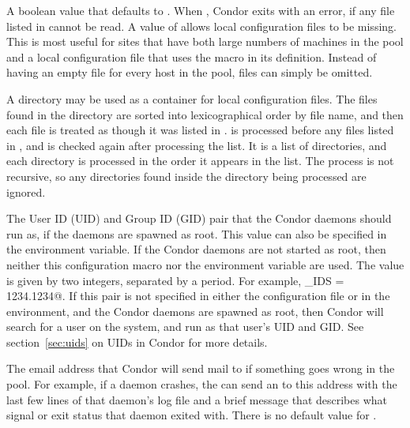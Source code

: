 \begin{description}
\label{param:RequireLocalConfigFile}
\item[\Macro{REQUIRE\_LOCAL\_CONFIG\_FILE}]
  A boolean value that defaults to .
  When , Condor exits with an error,
  if any file listed in  cannot be read.
  A value of  allows local configuration files to be missing.
  This is most useful for sites that have 
  both large numbers of machines in the pool and a local configuration file
  that uses the  macro in its definition.
  Instead of having an empty file for every host
  in the pool, files can simply be omitted.

\label{param:LocalConfigDir} 
\item[\Macro{LOCAL\_CONFIG\_DIR}]
  A directory may be used as a container for local configuration files. 
  The files found in the directory are sorted into lexicographical order 
  by file name, and 
  then each file is treated as though it was listed in 
  . 
   is processed before any files listed in 
  , and is checked again after processing
  the  list. 
  It is a list of directories, and each directory is processed in the order
  it appears in the list. 
  The process is not recursive, so any directories found inside the directory
  being processed are ignored. 

\label{param:CondorIds}
\item[\Macro{CONDOR\_IDS}]
  The User ID (UID) and Group ID (GID) pair that the Condor daemons
  should run as, if the daemons are spawned as root.
  This value can also be specified in the 
  environment variable.
  If the Condor daemons are not started as root, then neither this
   configuration macro nor the 
  environment variable are used.
  The value is given by two integers, separated by a period.  For
  example, \verb@CONDOR_IDS = 1234.1234@.
  If this pair is not specified in either the configuration file or in the
  environment, and the Condor daemons are spawned as root,
  then Condor will
  search for a \verb@condor@ user on the system, and run as that user's
  UID and GID.
  See section~\ref{sec:uids} on UIDs in Condor for more details.

\label{param:CondorAdmin}
\item[\Macro{CONDOR\_ADMIN}]
  The email address that Condor will send mail to if something goes wrong in
  the pool.  For example, if a daemon crashes, the 
  can send an  to this address with the last few lines
  of that daemon's log file and a brief message that describes what
  signal or exit status that daemon exited with.  There is no default
  value for .


\end{description}
